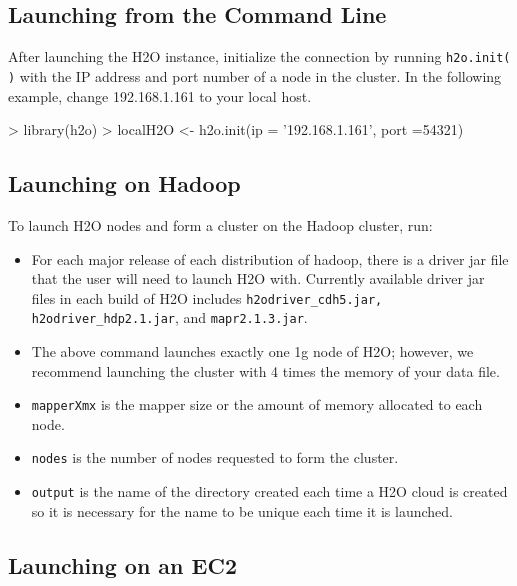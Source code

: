 \documentclass[11pt]{article}
\begin{document}
\subsection{Launching from the Command Line}

After launching the H2O instance, initialize the connection by running {\texttt{h2o.init( )}} with the IP address and port number of a node in the cluster. In the following example, change 192.168.1.161 to your local host. 
\begin{spverbatim}
> library(h2o)
> localH2O <- h2o.init(ip = '192.168.1.161', port =54321)
\end{spverbatim}

\subsection{Launching on Hadoop}

To launch H2O nodes and form a cluster on the Hadoop cluster, run:

\begin{itemize}
\item For each major release of each distribution of hadoop, there is a driver jar file that the user will need to launch H2O with. Currently available driver jar files in each build of H2O includes {\texttt{h2odriver_cdh5.jar, h2odriver_hdp2.1.jar}}, and {\texttt{mapr2.1.3.jar}}.
\item The above command launches exactly one 1g node of H2O; however,  we recommend launching the cluster with 4 times the memory of your data file.
\item{\texttt{mapperXmx}} is the mapper size or the amount of memory allocated to each node.
\item{\texttt{nodes}} is the number of nodes requested to form the cluster.
\item{\texttt{output}} is the name of the directory created each time a H2O cloud is created so it is necessary for the name to be unique each time it is launched.
\end{itemize}


\subsection{Launching on an EC2}
\end{document}

